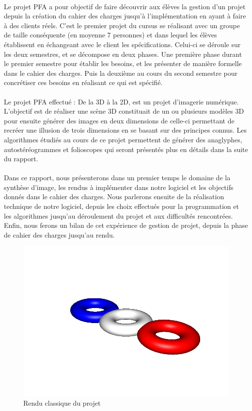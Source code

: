 \paragraph{}
        Le projet PFA a pour objectif de faire découvrir aux élèves la gestion d'un projet depuis la création du cahier des charges jusqu'à l'implémentation en ayant à faire à des clients réels. C'est le premier projet du cursus se réalisant avec un groupe de taille conséquente (en moyenne 7 personnes) et dans lequel les élèves établissent en échangeant avec le client les spécifications. Celui-ci se déroule sur les deux semestres, et se décompose en deux phases. Une première phase durant le premier semestre pour établir les besoins, et les présenter de manière formelle dans le cahier des charges. Puis la deuxième au cours du second semestre pour concrétiser ces besoins en réalisant ce qui est spécifié.

\paragraph{}      
        Le projet PFA effectué : De la 3D à la 2D, est un projet d'imagerie numérique. L'objectif est de réaliser une scène 3D constituait de un ou plusieurs modèles 3D pour ensuite générer des images en deux dimensions de celle-ci permettant de recréer une illusion de trois dimensions en se basant sur des principes connus. Les algorithmes étudiés au cours de ce projet permettent de générer des anaglyphes, autostéréogrammes et folioscopes qui seront présentés plus en détails dans la suite du rapport.
        
\paragraph{}
        Dans ce rapport, nous présenterons dans un premier temps le domaine de la synthèse d'image, les rendus à implémenter dans notre logiciel et les objectifs donnés dans le cahier des charges. Nous parlerons ensuite de la réalisation technique de notre logiciel, depuis les choix effectués pour la programmation et les algorithmes jusqu'au déroulement du projet et aux difficultés rencontrées. Enfin, nous ferons un bilan de cet expérience de gestion de projet, depuis la phase de cahier des charges jusqu'au rendu.

\begin{figure}[h]
	\centering
	\includegraphics[scale=0.4]{3donut_rendu.png}
	\caption{\label{fig:sphère} Rendu classique du projet \protect}
\end{figure}
